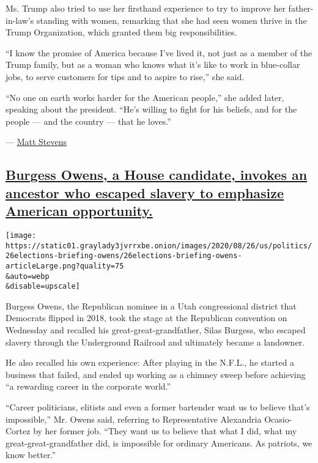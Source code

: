 Ms. Trump also tried to use her firsthand experience to try to improve
her father-in-law's standing with women, remarking that she had seen
women thrive in the Trump Organization, which granted them big
responsibilities.

``I know the promise of America because I've lived it, not just as a
member of the Trump family, but as a woman who knows what it's like to
work in blue-collar jobs, to serve customers for tips and to aspire to
rise,'' she said.

``No one on earth works harder for the American people,'' she added
later, speaking about the president. ``He's willing to fight for his
beliefs, and for the people --- and the country --- that he loves.''

--- \href{https://www.nytimes3xbfgragh.onion/by/matt-stevens}{Matt
Stevens}

\hypertarget{burgess-owens-a-house-candidate-invokes-an-ancestor-who-escaped-slavery-to-emphasize-american-opportunity}{%
\subsection{\texorpdfstring{\protect\hyperlink{burgess-owens-a-house-candidate-invokes-an-ancestor-who-escaped-slavery-to-emphasize-american-opportunity}{Burgess
Owens, a House candidate, invokes an ancestor who escaped slavery to
emphasize American
opportunity.}}{Burgess Owens, a House candidate, invokes an ancestor who escaped slavery to emphasize American opportunity.}}\label{burgess-owens-a-house-candidate-invokes-an-ancestor-who-escaped-slavery-to-emphasize-american-opportunity}}

\texttt{[image: https://static01.graylady3jvrrxbe.onion/images/2020/08/26/us/politics/26elections-briefing-owens/26elections-briefing-owens-articleLarge.png?quality=75\\\&auto=webp\\\&disable=upscale]}

Burgess Owens, the Republican nominee in a Utah congressional district
that Democrats flipped in 2018, took the stage at the Republican
convention on Wednesday and recalled his great-great-grandfather, Silas
Burgess, who escaped slavery through the Underground Railroad and
ultimately became a landowner.

He also recalled his own experience: After playing in the N.F.L., he
started a business that failed, and ended up working as a chimney sweep
before achieving ``a rewarding career in the corporate world.''

``Career politicians, elitists and even a former bartender want us to
believe that's impossible,'' Mr. Owens said, referring to Representative
Alexandria Ocasio-Cortez by her former job. ``They want us to believe
that what I did, what my great-great-grandfather did, is impossible for
ordinary Americans. As patriots, we know better.''

